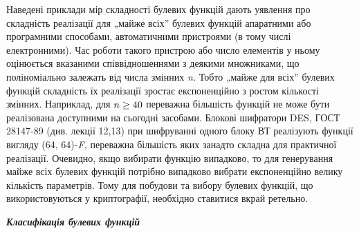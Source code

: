 Наведені приклади мір складності булевих функцій дають уявлення про складність
реалізації для „майже всіх” булевих функцій апаратними або програмними
способами, автоматичними пристроями (в тому числі електронними). Час роботи
такого пристрою або число елементів у ньому  оцінюється вказаними
співвідношеннями з деякими множниками, що поліноміально залежать від числа
змінних \textit{n}\textit{.} Тобто „майже для всіх” булевих функцій складність
їх реалізації зростає експоненційно з ростом кількості змінних. Наприклад, для 
$n\ge \text40$ переважна більшість функцій не може бути реалізована
доступними на сьогодні засобами. Блокові шифратори DES, ГОСТ 28147-89 (див.
лекції 12,13) при шифруванні одного блоку ВТ реалізують функції вигляду (64,
64)-\textit{F}\textit{, }переважна більшість яких занадто складна для
практичної реалізації. Очевидно, якщо вибирати функцію випадково, то для
генерування майже всіх булевих функцій потрібно випадково вибрати експоненційно
велику кількість параметрів. Тому для побудови та вибору булевих функцій, що
використовуються у криптографії, необхідно ставитися вкрай ретельно.\textit{  }


\bigskip


\bigskip

{\centering\bfseries\itshape
Класифікація булевих функцій
\par}


\bigskip


\bigskip

